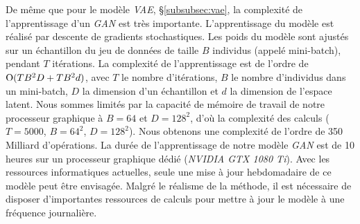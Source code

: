 De même que pour le modèle \textit{VAE}, §\ref{subsubsec:vae}, la complexité de l'apprentissage d'un \textit{GAN} est très importante.
L'apprentissage du modèle est réalisé par descente de gradients stochastiques.
Les poids du modèle sont ajustés sur un échantillon du jeu de données de taille $B$ individus (appelé mini-batch), pendant $T$ itérations.
La complexité de l'apprentissage est de l'ordre de $\operatorname{O}(T B^2 D + T B^2 d)$, avec $T$ le nombre d'itérations, $B$ le nombre d'individus dans un mini-batch, $D$ la dimension d'un échantillon et $d$ la dimension de l'espace latent.
Nous sommes limités par la capacité de mémoire de travail de notre processeur graphique à $B=64$ et $D=128^2$, d'où la complexité des calculs ($T=5000$, $B=64^2$, $D=128^2$). Nous obtenons une complexité de l'ordre de 350 Milliard d'opérations.
La durée de l'apprentissage de notre modèle \textit{GAN} est de 10 heures sur un processeur graphique dédié (\textit{NVIDIA GTX 1080 Ti}).
Avec les ressources informatiques actuelles, seule une mise à jour hebdomadaire de ce modèle peut être envisagée.
Malgré le réalisme de la méthode, il est nécessaire de disposer d'importantes ressources de calculs pour mettre à jour le modèle à une fréquence journalière.





%


